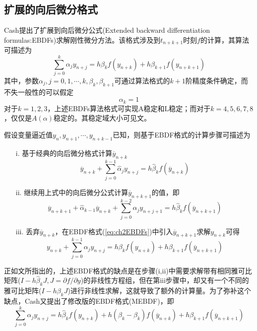 \subsection{扩展的向后微分格式}
Cash提出了扩展到向后微分公式(Extended backward differentiation formulas:EBDFs)\cite{Cash1980}求解刚性微分方法。该格式涉及到$t_{n+k+1}$时刻$f$的计算，其算法可描述为
\begin{equation}
\sum_{j=0}^{k}\alpha_jy_{n+j}=h\beta_kf(y_{n+k})+h\beta_{k+1}f(y_{n+k+1})\label{eq:ch2EBDFs}
\end{equation}
其中，参数$\alpha_j,j=0,1,\cdots,k,\beta_k,\beta_{k+1}$可通过算法格式的$k+1$阶精度条件确定，而不失一般性的可以假定
\begin{equation}
\alpha_k=1
\end{equation}
对于$k=1,2,3$，上述EBDFs算法格式可实现A稳定和L稳定；而对于$k=4,5,6,7,8$，仅仅是$A(\alpha)$稳定的。其稳定域大小可见文。

假设变量逼近值$y_n,y_{n+1},\cdots,y_{n+k-1}$已知，则基于EBDF格式的计算步骤可描述为
\begin{itemize}
\item[i.] 基于经典的向后微分格式计算$\overline{y}_{n+k}$
\begin{equation}
\overline{y}_{n+k}+\sum_{j=0}^{k-1}\hat{\alpha}_jy_{n+j}=h\hat{\beta}_kf(\overline{y}_{n+k})
\end{equation}
\item[ii.] 继续用上式中的向后微分公式计算$\overline{y}_{n+k+1}$的值，即
\begin{equation}
\overline{y}_{n+k+1}+\hat{\alpha}_{k-1}\overline{y}_{n+k}+\sum_{j=0}^{k-2}\hat{\alpha}_jy_{n+j+1}=h\hat{\beta}_kf(\overline{y}_{n+k+1})
\end{equation}
\item[iii.] 丢弃$\overline{y}_{n+k}$，在EBDF格式(\ref{eq:ch2EBDFs})中引入$\overline{y}_{n+k+1}$求解$y_{n+k}$可得
\begin{equation}
y_{n+k}+\sum_{j=0}^{k-1}\alpha_jy_{n+j}=h\beta_kf(y_{n+k})+h\beta_{k+1}f(\overline{y}_{n+k+1})
\end{equation}
\end{itemize}
正如文所指出的，上述EBDF格式的缺点是在步骤(i,ii)中需要求解带有相同雅可比矩阵($I-h\hat{\beta}_kJ,J=\partial f/\partial y$)的非线性方程组，但在第iii步骤中，却又有一个不同的雅可比矩阵($I-h\beta_kJ$)进行非线性求解，这就导致了额外的计算量。为了弥补这个缺点，Cash又提出了修改版的EBDF格式(MEBDF)\cite{Cash1983}，即
\begin{equation}
\sum_{j=0}^{k}\alpha_jy_{n+j}=h\hat{\beta}_kf(y_{n+k})+h(\beta_k-\hat{\beta}_k)f(\overline{y}_{n+k})+h\beta_{k+1}f(\overline{y}_{n+k+1})
\end{equation}

